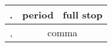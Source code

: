 \documentclass[winfonts,UTF8]{article}
\begin{document}
\begin{table}
\begin{tabular}{|c|c|}
\hline 
. & period \ full stop \\ 
\hline 
, & comma \\ 
\hline 
\end{tabular} 
\end{table}
\end{document}
